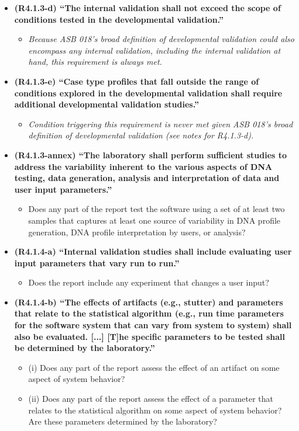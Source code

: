\begin{itemize}
    \item \textbf{(R4.1.3-d) ``The internal validation shall not exceed the scope of conditions tested in the developmental validation.''}~\cite[p.~3]{asb018}
    \begin{itemize}
        \item \textit{Because ASB 018's broad definition of developmental validation could also encompass any internal validation, including the internal validation at hand, this requirement is always met.}
    \end{itemize}

    \item \textbf{(R4.1.3-e) ``Case type profiles that fall outside the range of conditions explored in the developmental validation shall require additional developmental validation studies.''}~\cite[p.~3]{asb018}
    \begin{itemize}
        \item \textit{Condition triggering this requirement is never met given ASB 018's broad definition of developmental validation (see notes for R4.1.3-d).}
    \end{itemize}

    \item \textbf{(R4.1.3-annex) ``The laboratory shall perform sufficient studies to address the variability inherent to the various aspects of DNA testing, data generation, analysis and interpretation of data and user input parameters.''}~\cite[p.~5]{asb018}
    \begin{itemize}
        \item Does any part of the report test the software using a set of at least two samples that captures at least one source of variability in DNA profile generation, DNA profile interpretation by users, or analysis?
    \end{itemize}

    \item \textbf{(R4.1.4-a) ``Internal validation studies shall include evaluating user input parameters that vary run to run.''}~\cite[p.~3]{asb018}
    \begin{itemize}
        \item Does the report include any experiment that changes a user input?
    \end{itemize}

    \item \textbf{(R4.1.4-b) ``The effects of artifacts (e.g., stutter) and parameters that relate to the statistical algorithm (e.g., run time parameters for the software system that can vary from system to system) shall also be evaluated. [...] [T]he specific parameters to be tested shall be determined by the laboratory.''}~\cite[p.~3]{asb018}
    \begin{itemize}
        \item (i) Does any part of the report assess the effect of an artifact on some aspect of system behavior?
        \item (ii) Does any part of the report assess the effect of a parameter that relates to the statistical algorithm on some aspect of system behavior? Are these parameters determined by the laboratory?
    \end{itemize}



\end{itemize}
